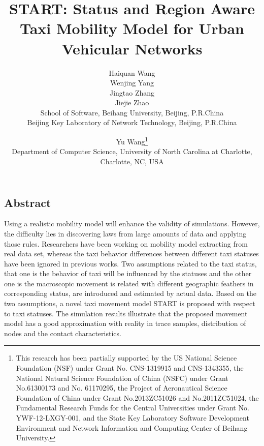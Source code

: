 \documentclass[twocolumn,10pt]{IEEEtran}
\begin{document}
\date{}

\title{\Large \bf START: Status and Region Aware Taxi Mobility Model for Urban Vehicular Networks}

\author{
{\rm Haiquan Wang}\\
{\rm Wenjing Yang}\\
{\rm Jingtao Zhang}\\
{\rm Jiejie Zhao}\\
School of Software, Beihang University, Beijing, P.R.China\\
Beijing Key Laboratory of Network Technology, Beijing, P.R.China\\
\and
{\rm Yu Wang\thanks{
 This research has been partially supported by the US National Science Foundation (NSF) under Grant No. CNS-1319915 and CNS-1343355, the National Natural Science Foundation of China (NSFC) under Grant No.61300173 and No. 61170295, the Project of Aeronautical Science Foundation of China under Grant No.2013ZC51026 and No.2011ZC51024, the Fundamental Research Funds for the Central Universities under Grant No. YWF-12-LXGY-001, and the State Key Laboratory Software Development Environment and Network Information and Computing Center of Beihang University.}}\\
Department of Computer Science, University of North Carolina at Charlotte, Charlotte, NC, USA\\
} %

\maketitle


\subsection*{Abstract}
Using a realistic mobility model will enhance the validity of simulations. However, the difficulty lies in discovering laws from large amounts of data and applying those rules. Researchers have been working on mobility model extracting from real data set, whereas the taxi behavior differences between different taxi statuses have been ignored in previous works.
Two assumptions related to the taxi status, that one is the behavior of taxi will be influenced by the statuses and the other one is the macroscopic movement is related with different geographic feathers in corresponding status, are introduced and estimated by actual data. Based on the two assumptions, a novel taxi movement model START is proposed with respect to taxi statuses. The simulation results illustrate that the proposed movement model has a good approximation with reality in trace samples, distribution of nodes and the contact characteristics.
\end{document}
